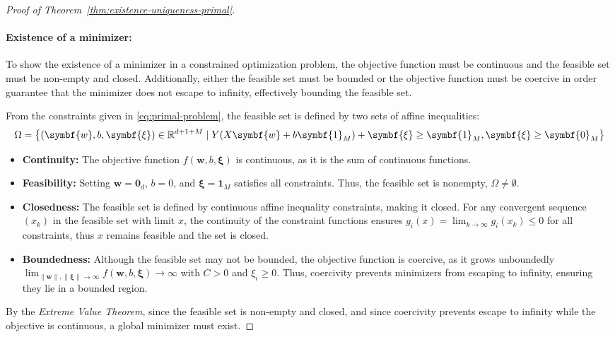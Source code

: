 \begin{proof}[Proof of Theorem~\ref{thm:existence-uniqueness-primal}]
	\vspace{-0.4cm}
	\paragraph{Existence of a minimizer:}
	To show the existence of a minimizer in a constrained optimization problem, the objective function must be continuous and the feasible set must be non-empty and closed.
	Additionally, either the feasible set must be bounded or the objective function must be coercive in order
	guarantee that the minimizer does not escape to infinity, effectively bounding the feasible set.

	\medskip

	From the constraints given in \eqref{eq:primal-problem}, the feasible set is defined by two sets of affine inequalities:
	\begin{equation*}
		\Omega = \bigl\{(\symbf{w}, b, \symbf{\xi}) \in \R^{d+1+M} \mid
		Y(X\symbf{w} + b\symbf{1}_M) + \symbf{\xi} \ge \symbf{1}_M, \symbf{\xi} \ge \symbf{0}_M
		\bigr\}
	\end{equation*}
	\begin{itemize}
		\item \textbf{Continuity:} The objective function \(f(\symbf{w}, b, \symbf{\xi})\) is continuous, as it is the sum of continuous functions.
		\item \textbf{Feasibility:} Setting $\symbf{w} = \symbf{0}_d$, $b = 0$, and
		      $\symbf{\xi} = \symbf{1}_M$ satisfies all constraints. Thus, the feasible set is nonempty, \(\Omega \neq \emptyset\).
		\item \textbf{Closedness:} The feasible set is defined by continuous affine inequality constraints, making it closed. For any convergent sequence $(x_k)$ in the feasible set with limit $x$, the continuity of the constraint functions ensures $g_i(x) = \lim_{k\to\infty} g_i(x_k) \leq 0$ for all constraints, thus $x$ remains feasible and the set is closed.
		\item \textbf{Boundedness:} Although the feasible set may not be bounded, the objective function is
		      coercive, as it grows unboundedly \(\lim_{\|\symbf{w}\|, \|\symbf{\xi}\| \to \infty} f(\symbf{w}, b, \symbf{\xi}) \to \infty\)
		      with $C > 0$ and $\xi_i \ge 0$. Thus, coercivity prevents minimizers from escaping to infinity,
		      ensuring they lie in a bounded region.
	\end{itemize}
	By the \emph{Extreme Value Theorem}, since the feasible set is non-empty and closed, and since coercivity
	prevents escape to infinity while the objective is continuous, a global minimizer must exist\cite{rockafellar1970convex}.

\end{proof}
